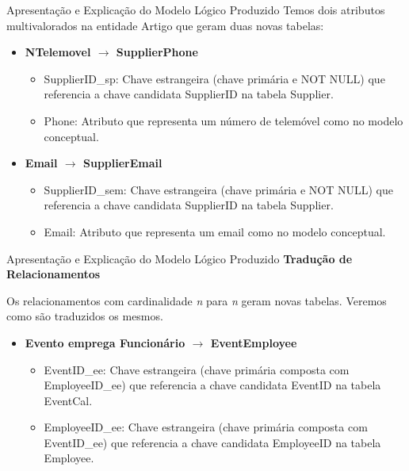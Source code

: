 \documentclass[compress,svgnames,handout,13.7pt]{beamer}
\begin{document}
\begin{frame}{Apresentação e Explicação do Modelo Lógico Produzido}
             Temos dois atributos multivalorados na entidade Artigo que geram duas novas tabelas:
             \begin{itemize}
                \item{\textbf{NTelemovel $\rightarrow$ SupplierPhone}}
                    \begin{itemize}
                        \item{SupplierID\_sp:} Chave estrangeira (chave primária e NOT NULL) que referencia a chave candidata SupplierID
                        na tabela Supplier.
                        \item{Phone:} Atributo que representa um número de telemóvel como no modelo conceptual.
                    \end{itemize}
                \item{\textbf{Email $\rightarrow$ SupplierEmail}}
                    \begin{itemize}
                        \item{SupplierID\_sem:} Chave estrangeira (chave primária e NOT NULL) que referencia a chave candidata SupplierID na tabela Supplier.
                        \item{Email:} Atributo que representa um email como no modelo conceptual.
                    \end{itemize}
            \end{itemize}    
\end{frame}

\begin{frame}{Apresentação e Explicação do Modelo Lógico Produzido}
    \textbf{Tradução de Relacionamentos}
    
    Os relacionamentos com cardinalidade \textit{n} para \textit{n} geram novas tabelas. Veremos como são traduzidos os mesmos.
    \begin{itemize}
        \item{\textbf{Evento emprega Funcionário $\rightarrow$ EventEmployee}}
            \begin{itemize}
                \item{EventID\_ee:} Chave estrangeira (chave primária composta com EmployeeID\_ee) que referencia a chave candidata EventID na tabela EventCal.
                \item{EmployeeID\_ee:} Chave estrangeira (chave primária composta com EventID\_ee) que referencia a chave candidata EmployeeID na tabela Employee.
            \end{itemize}
    \end{itemize}
\end{frame}
\end{document}
